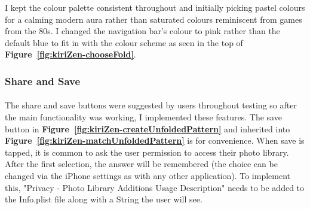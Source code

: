 \documentclass[11pt]{article}
\begin{document}
            I kept the colour palette consistent throughout and initially picking pastel colours for a calming modern  aura rather than saturated colours reminiscent from games from the 80s. I changed the navigation bar's colour to pink rather than the default blue to fit in with the colour scheme as seen in the top of \textbf{Figure~\ref{fig:kiriZen-chooseFold}}.
            
            
             \subsubsection{Share and Save}
                \paragraph{}
                
                The share and save buttons were suggested by users throughout testing so after the main functionality was working, I implemented these features. The save button in \textbf{Figure~\ref{fig:kiriZen-createUnfoldedPattern}} and inherited into \textbf{Figure~\ref{fig:kiriZen-matchUnfoldedPattern}} is for convenience. When save is tapped, it is common to ask the user permission to access their photo library. After the first selection, the answer will be remembered (the choice can be changed via the iPhone settings as with any other application). To implement this,                 "Privacy - Photo Library Additions Usage Description" needs to be added to the Info.plist file along with a String the user will see. %
                
\end{document}
